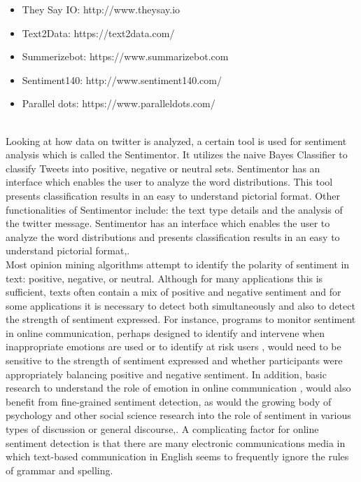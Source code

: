 \begin{itemize}

\item They Say IO:  http://www.theysay.io
\item Text2Data:  https://text2data.com/
\item Summerizebot:  https://www.summarizebot.com
\item Sentiment140: http://www.sentiment140.com/
\item Parallel dots: https://www.paralleldots.com/

\end{itemize}
\leavevmode\\
Looking at how data on twitter is analyzed, a certain tool is used for sentiment analysis which is called the Sentimentor. It utilizes the naive Bayes Classifier to classify Tweets into positive, negative or neutral sets. Sentimentor has an interface which enables the user to analyze the word distributions. This tool presents classification results in an easy to understand pictorial format. Other functionalities of Sentimentor include: the text type details and the analysis of the twitter message. Sentimentor has an interface which enables the user to analyze the word distributions and presents classification results in an easy to understand pictorial format,\cite{ref15}.
\leavevmode\\
Most opinion mining algorithms attempt to identify the polarity of sentiment in text: positive, negative, or neutral. Although for many applications this is sufficient, texts often contain a mix of positive and negative sentiment and for some applications it is necessary to detect both simultaneously and also to detect the strength of sentiment expressed. For instance, programs to monitor sentiment in online communication, perhaps designed to identify and intervene when inappropriate emotions are used or to identify at risk users \cite{ref16}, would need to be sensitive to the strength of sentiment expressed and whether participants were appropriately balancing positive and negative sentiment. In addition, basic research to understand the role of emotion in online communication \cite{ref17}, would also benefit from fine-grained sentiment detection, as would the growing body of psychology and other social science research into the role of sentiment in various types of discussion or general discourse,\cite{ref18}. A complicating factor for online sentiment detection is that there are many electronic communications media in which text-based communication in English seems to frequently ignore the rules of grammar and spelling.\\


